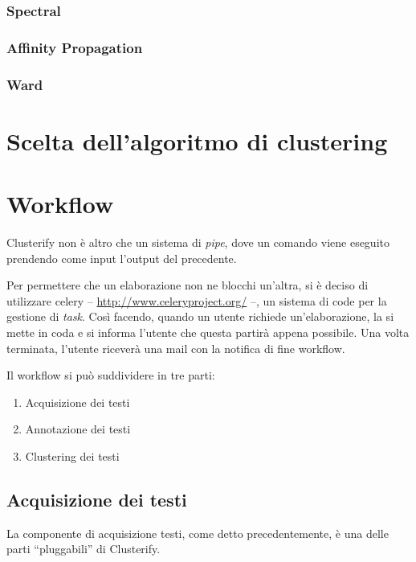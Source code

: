 		\subsubsection{Spectral}
			

		\subsubsection{Affinity Propagation}
			

		\subsubsection{Ward}
			
		

\section{Scelta dell'algoritmo di clustering}
	

\section{Workflow}
	Clusterify non è altro che un sistema di \emph{pipe}, dove un comando viene eseguito prendendo come input l'output del precedente.

	Per permettere che un elaborazione non ne blocchi un'altra, si è deciso di utilizzare celery -- \url{http://www.celeryproject.org/} --, un sistema di code per la gestione di \emph{task}. Così facendo, quando un utente richiede un'elaborazione, la si mette in coda e si informa l'utente che questa partirà appena possibile. Una volta terminata, l'utente riceverà una mail con la notifica di fine workflow.

	Il workflow si può suddividere in tre parti:

	\begin{enumerate}
  		\item Acquisizione dei testi
  		\item Annotazione dei testi
 		\item Clustering dei testi
	\end{enumerate} 
	
	\subsection{Acquisizione dei testi}
		La componente di acquisizione testi, come detto precedentemente, è una delle parti ``pluggabili'' di Clusterify.

